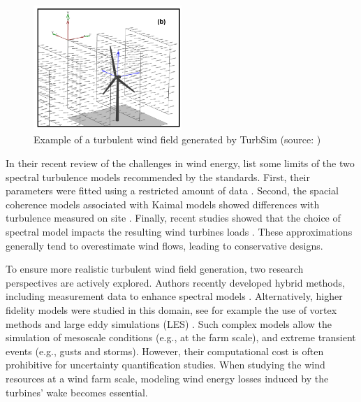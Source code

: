 \begin{figure}
    \centering
    \includegraphics[width=0.5\textwidth]{./part1/figures/turbsim.png}
    \caption{Example of a turbulent wind field generated by TurbSim (source: \citealt{turbsim_2009})}
    \label{fig:turbsim_simu}
\end{figure}

In their recent review of the challenges in wind energy, \citep{veers_2019_review} list some limits of the two spectral turbulence models recommended by the standards. 
First, their parameters were fitted using a restricted amount of data \citep{dimitrov_2017_turbulence_models_on_loads}. 
Second, the spacial coherence models associated with Kaimal models showed differences with turbulence measured on site \citep{saranyasoontorn_2004}.  
Finally, recent studies showed that the choice of spectral model impacts the resulting wind turbines loads \citep{doubrawa_2019}. 
These approximations generally tend to overestimate wind flows, leading to conservative designs. 

To ensure more realistic turbulent wind field generation, two research perspectives are actively explored. 
Authors recently developed hybrid methods, including measurement data to enhance spectral models \citep{dimitrov_2017_constrained_turbulence}. 
Alternatively, higher fidelity models were studied in this domain, see for example the use of vortex methods \citep{branlard_2017_book} and large eddy simulations (LES) \citep{doubrawa_2019,bui_2022_mesoscale_LES}.  
Such complex models allow the simulation of mesoscale conditions (e.g., at the farm scale), and extreme transient events (e.g., gusts and storms). 
However, their computational cost is often prohibitive for uncertainty quantification studies. 
When studying the wind resources at a wind farm scale, modeling wind energy losses induced by the turbines' wake becomes essential. 



